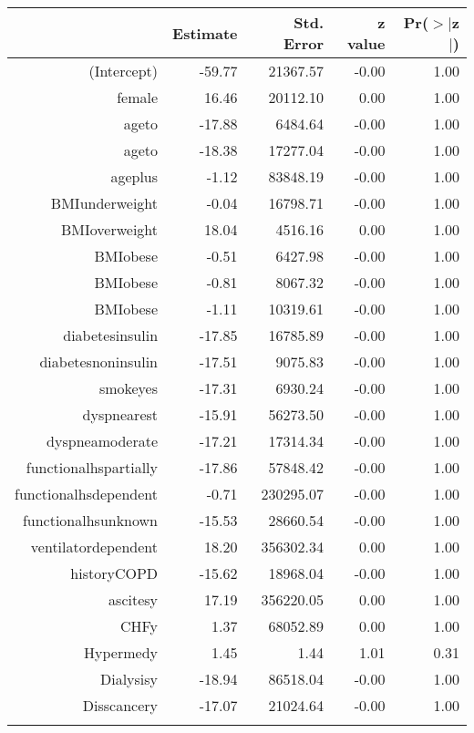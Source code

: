 \bigskip\bigskip
\centering
\begin{tabular}{rrrrr}
  \hline
 & Estimate & Std. Error & z value & Pr($>$$|$z$|$) \\ 
  \hline
(Intercept) & -59.77 & 21367.57 & -0.00 & 1.00 \\ 
  female & 16.46 & 20112.10 & 0.00 & 1.00 \\ 
  age\-65\-to\-74 & -17.88 & 6484.64 & -0.00 & 1.00 \\ 
  age\-75\-to\-84 & -18.38 & 17277.04 & -0.00 & 1.00 \\ 
  age\-85\-plus & -1.12 & 83848.19 & -0.00 & 1.00 \\ 
  BMI\-underweight & -0.04 & 16798.71 & -0.00 & 1.00 \\ 
  BMI\-overweight & 18.04 & 4516.16 & 0.00 & 1.00 \\ 
  BMI\-obese\-1 & -0.51 & 6427.98 & -0.00 & 1.00 \\ 
  BMI\-obese\-2 & -0.81 & 8067.32 & -0.00 & 1.00 \\ 
  BMI\-obese\-3 & -1.11 & 10319.61 & -0.00 & 1.00 \\ 
  diabetes\-insulin & -17.85 & 16785.89 & -0.00 & 1.00 \\ 
  diabetes\-noninsulin & -17.51 & 9075.83 & -0.00 & 1.00 \\ 
  smoke\-yes & -17.31 & 6930.24 & -0.00 & 1.00 \\ 
  dyspnea\-rest & -15.91 & 56273.50 & -0.00 & 1.00 \\ 
  dyspnea\-moderate & -17.21 & 17314.34 & -0.00 & 1.00 \\ 
  functional\-hs\-partially & -17.86 & 57848.42 & -0.00 & 1.00 \\ 
  functional\-hs\-dependent & -0.71 & 230295.07 & -0.00 & 1.00 \\ 
  functional\-hs\-unknown & -15.53 & 28660.54 & -0.00 & 1.00 \\ 
  ventilator\-dependent & 18.20 & 356302.34 & 0.00 & 1.00 \\ 
  history\-COPD & -15.62 & 18968.04 & -0.00 & 1.00 \\ 
  ascites\-y & 17.19 & 356220.05 & 0.00 & 1.00 \\ 
  CHF\-y & 1.37 & 68052.89 & 0.00 & 1.00 \\ 
  Hyper\-med\-y & 1.45 & 1.44 & 1.01 & 0.31 \\ 
  Dialysis\-y & -18.94 & 86518.04 & -0.00 & 1.00 \\ 
  Diss\-cancer\-y & -17.07 & 21024.64 & -0.00 & 1.00 \\ 
$$
\end{tabular}

